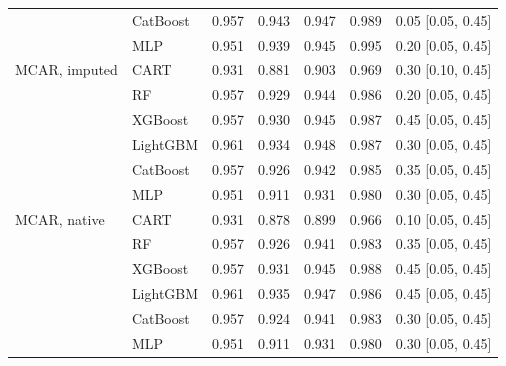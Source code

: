 \begin{table}[p]
\begin{tabular}{@{}llrrrrl@{}}
 & CatBoost & 0.957 & 0.943 & 0.947 & 0.989 & 0.05 [0.05, 0.45] \\
 & MLP & 0.951 & 0.939 & 0.945 & 0.995 & 0.20 [0.05, 0.45] \\
\midrule
MCAR, imputed & CART & 0.931 & 0.881 & 0.903 & 0.969 & 0.30 [0.10, 0.45] \\
 & RF & 0.957 & 0.929 & 0.944 & 0.986 & 0.20 [0.05, 0.45] \\
 & XGBoost & 0.957 & 0.930 & 0.945 & 0.987 & 0.45 [0.05, 0.45] \\
 & LightGBM & 0.961 & 0.934 & 0.948 & 0.987 & 0.30 [0.05, 0.45] \\
 & CatBoost & 0.957 & 0.926 & 0.942 & 0.985 & 0.35 [0.05, 0.45] \\
 & MLP & 0.951 & 0.911 & 0.931 & 0.980 & 0.30 [0.05, 0.45] \\
\midrule
MCAR, native & CART & 0.931 & 0.878 & 0.899 & 0.966 & 0.10 [0.05, 0.45] \\
 & RF & 0.957 & 0.926 & 0.941 & 0.983 & 0.35 [0.05, 0.45] \\
 & XGBoost & 0.957 & 0.931 & 0.945 & 0.988 & 0.45 [0.05, 0.45] \\
 & LightGBM & 0.961 & 0.935 & 0.947 & 0.986 & 0.45 [0.05, 0.45] \\
 & CatBoost & 0.957 & 0.924 & 0.941 & 0.983 & 0.30 [0.05, 0.45] \\
 & MLP & 0.951 & 0.911 & 0.931 & 0.980 & 0.30 [0.05, 0.45] \\
\bottomrule
\end{tabular}
\end{table}

